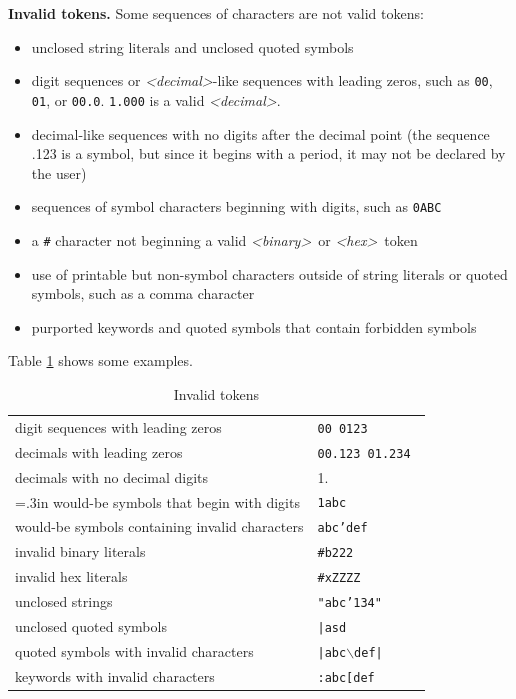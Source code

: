 \documentclass[12pt,oneside]{report}
\newcommand{\bs}{{\tt \char'134}}
\newcommand{\decimal}{{\it <decimal>}}
\newcommand{\binary}{{\it <binary>}}
\newcommand{\hex}{{\it <hex>}}
\newcommand{\nospace}{\setlength{\itemsep}{0in}\setlength{\parsep}{0in}\setlength{\parskip}{0in}\setlength{\topsep}{0in}}
\begin{document}
{\bf Invalid tokens.}  Some sequences of characters are not valid tokens:
\begin{itemize} \nospace
\item unclosed string literals and unclosed quoted symbols
\item digit sequences or \decimal-like sequences with leading zeros, such as {\tt 00}, {\tt 01}, or {\tt 00.0}.  {\tt 1.000} is a valid \decimal.
\item decimal-like sequences with no digits after the decimal point (the sequence .123 is a symbol, but since it  begins with a period, 
it may not be declared by the user)
\item sequences of symbol characters beginning with digits, such as {\tt 0ABC}
\item a {\tt \#} character not beginning a valid \binary~or \hex~token
\item use of printable but non-symbol characters outside of string literals or quoted symbols, such as a comma character
\item purported keywords and quoted symbols that contain forbidden symbols
\end{itemize}
Table \ref{tab:InvalidTokens} shows some examples.
\begin{table} \center
\begin{tabular}{|p{3.5in}|p{2in}|}  
\hline  
digit sequences with leading zeros & {\tt 00 0123 } \\
decimals with leading zeros & {\tt 00.123 01.234 } \\
decimals with no decimal digits & { 1. } \\
\hangindent=.3in \hangafter=1
would-be symbols that begin with digits & {\tt 1abc }\\
would-be symbols containing invalid characters & {\tt abc'def} \\
invalid binary literals & {\tt \#b222 } \\
invalid hex literals & {\tt \#xZZZZ }\\
unclosed strings & {\tt "abc\bs" } \\
unclosed quoted symbols & {\tt |asd } \\
quoted symbols with invalid characters & {\tt |abc$\backslash$def| } \\
keywords with invalid characters & {\tt :abc[def } \\
\hline
\end{tabular}
\caption{Invalid tokens}
\label{tab:InvalidTokens}
\end{table}
\end{document}
